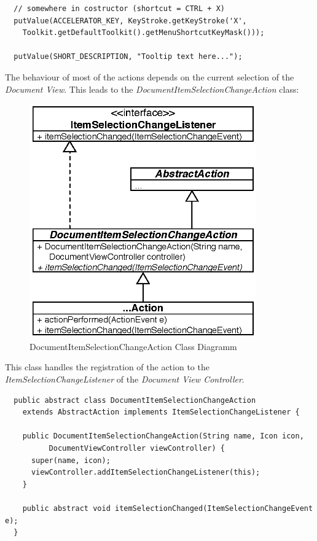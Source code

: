 \begin{verbatim}
  // somewhere in costructor (shortcut = CTRL + X)
  putValue(ACCELERATOR_KEY, KeyStroke.getKeyStroke('X',
    Toolkit.getDefaultToolkit().getMenuShortcutKeyMask()));

  putValue(SHORT_DESCRIPTION, "Tooltip text here...");
\end{verbatim}

The behaviour of most of the actions depends on the current selection of the \textit{Document View}. This leads to the \textit{DocumentItemSelectionChangeAction} class:

\begin{figure}[H]
\begin{center}
  \includegraphics[height=3.97in, width=3.85in]{../images/finalreport/application_action.eps}
\caption{DocumentItemSelectionChangeAction Class Diagramm}
\label{application_application_action}
\end{center}
\end{figure}

This class handles the registration of the action to the \textit{ItemSelectionChangeListener} of  the \textit{Document View Controller}.

\begin{verbatim}
  public abstract class DocumentItemSelectionChangeAction
    extends AbstractAction implements ItemSelectionChangeListener {
  
    public DocumentItemSelectionChangeAction(String name, Icon icon,
          DocumentViewController viewController) {
      super(name, icon);
      viewController.addItemSelectionChangeListener(this);
    }
    
    public abstract void itemSelectionChanged(ItemSelectionChangeEvent e);
  }
\end{verbatim}

